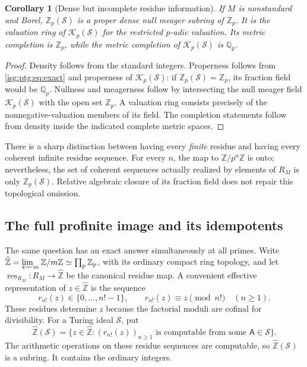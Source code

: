 \documentclass[11pt]{article}
\newtheorem{corollary}[corollary]{Corollary}
\theoremstyle{definition}
\theoremstyle{remark}
\newcommand{\Z}{\mathbb{Z}}
\newcommand{\Zhat}{\widehat{\Z}}
\newcommand{\res}{\operatorname{res}}
\newcommand{\Qp}{\mathbb{Q}_p}
\newcommand{\Zp}{\mathbb{Z}_p}
\begin{document}
\begin{corollary}[Dense but incomplete residue information]\label{isg:ptg:cor:residuesmall}
If $M$ is nonstandard and Borel, $\Zp(\mathcal S)$ is a proper dense null
meager subring of $\Zp$. It is the valuation ring of
$\mathcal K_p(\mathcal S)$ for the restricted $p$-adic valuation. Its
metric completion is $\Zp$, while the metric completion of
$\mathcal K_p(\mathcal S)$ is $\Qp$.
\end{corollary}
\begin{proof}
Density follows from the standard integers. Properness follows from
\eqref{isg:ptg:eq:exact} and properness of $\mathcal K_p(\mathcal S)$: if
$\Zp(\mathcal S)=\Zp$, its fraction field would be $\Qp$. Nullness and
meagerness follow by intersecting the null meager field
$\mathcal K_p(\mathcal S)$ with the open set $\Zp$. A valuation ring
consists precisely of the nonnegative-valuation members of its field. The
completion statements follow from density inside the indicated complete
metric spaces.
\end{proof}

There is a sharp distinction between having every \emph{finite} residue
and having every coherent infinite residue sequence. For every $n$, the map
to $\Z/p^n\Z$ is onto; nevertheless, the set of coherent sequences actually
realized by elements of $R_M$ is only $\Zp(\mathcal S)$. Relative algebraic
closure of its fraction field does not repair this topological omission.

\subsection{The full profinite image and its idempotents}\label{isg:ptg:sec:profinite}
The same question has an exact answer simultaneously at all primes. Write
$\Zhat=\varprojlim_m\Z/m\Z\simeq\prod_p\Zp$, with its ordinary compact ring
topology, and let $\res_{R_M}:R_M\to\Zhat$ be the canonical residue map. A
convenient effective representation of $z\in\Zhat$ is the sequence
\[
 r_{n!}(z)\in\{0,\ldots,n!-1\},\qquad r_{n!}(z)\equiv z\pmod{n!}
 \quad(n\geq1).
\]
These residues determine $z$ because the factorial moduli are cofinal for
divisibility. For a Turing ideal $\mathcal S$, put
\[
 \Zhat(\mathcal S)=\{z\in\Zhat:(r_{n!}(z))_{n\geq1}
       \text{ is computable from some }\mathsf A\in\mathcal S\}.
\]
The arithmetic operations on these residue sequences are computable, so
$\Zhat(\mathcal S)$ is a subring. It contains the ordinary integers.
\end{document}
